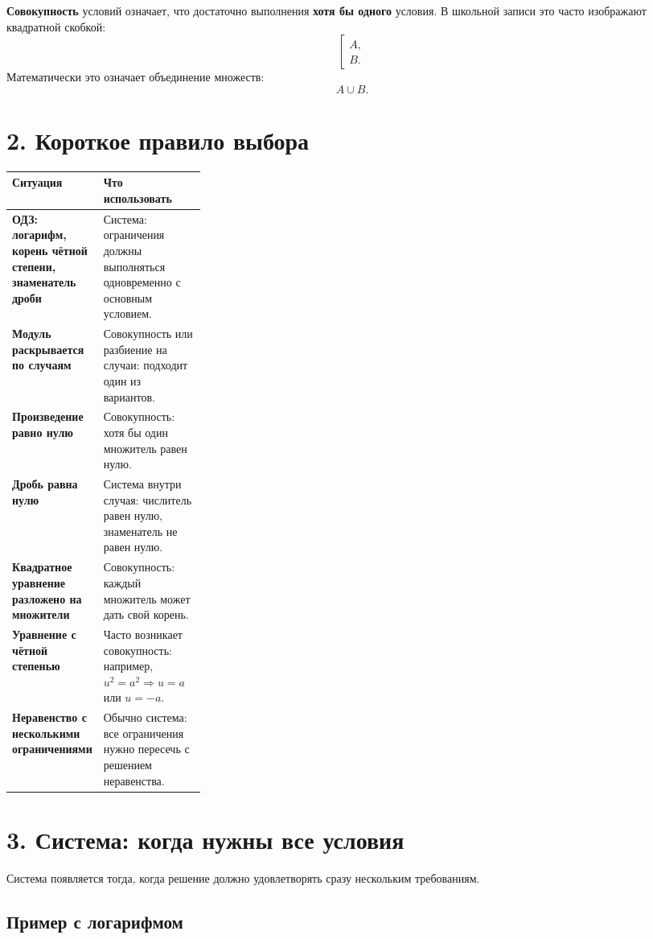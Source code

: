 \documentclass[a4paper,12pt]{article}
\newcommand{\important}[1]{\textcolor{darkaccent}{\textbf{#1}}}
\begin{document}
\important{Совокупность} условий означает, что достаточно выполнения \important{хотя бы одного} условия. В школьной записи это часто изображают квадратной скобкой:
\[
\left[
\begin{array}{l}
A,\\
B.
\end{array}
\right.
\]
Математически это означает объединение множеств:
\[
A\cup B.
\]

\section*{2. Короткое правило выбора}

\begin{center}
\renewcommand{\arraystretch}{1.35}
\begin{tabularx}{\linewidth}{>{\bfseries}p{0.28\linewidth}X}
\toprule
Ситуация & Что использовать \\
\midrule
ОДЗ: логарифм, корень чётной степени, знаменатель дроби & Система: ограничения должны выполняться одновременно с основным условием. \\
Модуль раскрывается по случаям & Совокупность или разбиение на случаи: подходит один из вариантов. \\
Произведение равно нулю & Совокупность: хотя бы один множитель равен нулю. \\
Дробь равна нулю & Система внутри случая: числитель равен нулю, знаменатель не равен нулю. \\
Квадратное уравнение разложено на множители & Совокупность: каждый множитель может дать свой корень. \\
Уравнение с чётной степенью & Часто возникает совокупность: например, $u^2=a^2 \Rightarrow u=a$ или $u=-a$. \\
Неравенство с несколькими ограничениями & Обычно система: все ограничения нужно пересечь с решением неравенства. \\
\bottomrule
\end{tabularx}
\end{center}

\section*{3. Система: когда нужны все условия}

Система появляется тогда, когда решение должно удовлетворять сразу нескольким требованиям.

\subsection*{Пример с логарифмом}
\end{document}
